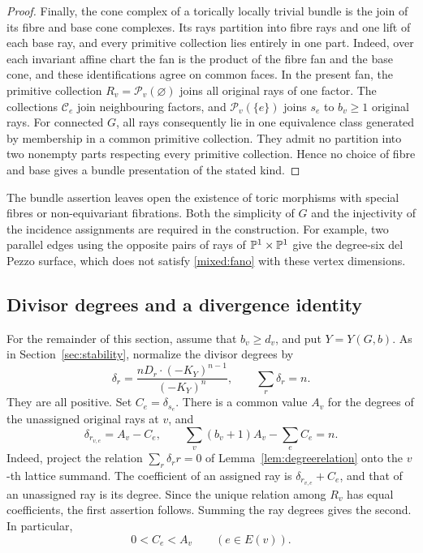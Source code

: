\begin{proof}
Finally, the cone complex of a torically locally trivial bundle is the
join of its fibre and base cone complexes. Its rays partition into fibre
rays and one lift of each base ray, and every primitive collection lies
entirely in one part. Indeed, over each invariant affine chart the fan is the product of
the fibre fan and the base cone, and these identifications agree on
common faces. In the present fan, the primitive collection $R_v=\mathcal P_v(\varnothing)$ joins all original rays of
one factor. The collections $\mathcal C_e$ join neighbouring factors,
and $\mathcal P_v(\{e\})$ joins $s_e$ to $b_v\ge1$ original rays.
For connected $G$, all rays consequently lie in one equivalence class
generated by membership in a common primitive collection. They admit
no partition into two nonempty parts respecting every primitive
collection. Hence no choice of fibre and base gives a bundle presentation of the
stated kind.
\end{proof}

The bundle assertion leaves open the existence of toric morphisms with
special fibres or non-equivariant fibrations. Both the simplicity of
$G$ and the injectivity of the incidence assignments are required in
the construction. For example, two parallel edges using the
opposite pairs of rays of $\mathbb{P}^1\times\mathbb{P}^1$ give the degree-six del Pezzo
surface, which does not satisfy \eqref{mixed:fano} with these vertex
dimensions.

\subsection{Divisor degrees and a divergence identity}

For the remainder of this section, assume that $b_v\ge d_v$, and put $Y=Y(G,b)$. As in
Section~\ref{sec:stability}, normalize the divisor degrees by
\begin{equation}\label{mixed:normalized-degrees}
 \delta_r=\frac{nD_r\cdot(-K_Y)^{n-1}}{(-K_Y)^n},
 \qquad \sum_r\delta_r=n.
\end{equation}
They are all positive. Set $C_e=\delta_{s_e}$. There is a common value
$A_v$ for the degrees of the unassigned original rays at $v$, and
\begin{equation}\label{mixed:degree-relations}
 \delta_{r_{v,e}}=A_v-C_e,\qquad
 \sum_v(b_v+1)A_v-\sum_eC_e=n.
\end{equation}
Indeed, project the relation $\sum_r\delta_r r=0$ of
Lemma~\ref{lem:degreerelation} onto the $v$-th lattice summand. The
coefficient of an assigned ray is $\delta_{r_{v,e}}+C_e$, and that
of an unassigned ray is its degree. Since the unique relation among $R_v$ has equal coefficients, the first
assertion follows. Summing the ray degrees gives the second. In particular,
\begin{equation}\label{mixed:degree-positive}
 0<C_e<A_v\qquad(e\in E(v)).
\end{equation}

